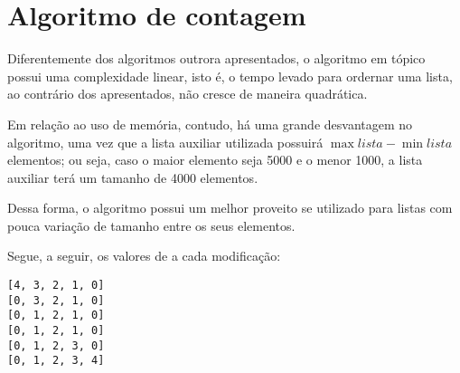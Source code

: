 \section{Algoritmo de contagem}
Diferentemente dos algoritmos outrora apresentados, o algoritmo em tópico possui uma complexidade linear, isto é, o tempo levado para ordernar uma lista, ao contrário dos apresentados, não cresce de maneira quadrática. 

Em relação ao uso de memória, contudo, há uma grande desvantagem no algoritmo, uma vez que a lista auxiliar utilizada possuirá $\max{lista}-\min{lista} $ elementos; ou seja, caso o maior elemento seja 5000 e o menor 1000, a lista auxiliar terá um tamanho de 4000 elementos.

Dessa forma, o algoritmo possui um melhor proveito se utilizado para listas com pouca variação de tamanho entre os seus elementos.

Segue, a seguir, os valores de  a cada modificação:
\begin{lstlisting}
[4, 3, 2, 1, 0]
[0, 3, 2, 1, 0]
[0, 1, 2, 1, 0]
[0, 1, 2, 1, 0]
[0, 1, 2, 3, 0]
[0, 1, 2, 3, 4]
\end{lstlisting}